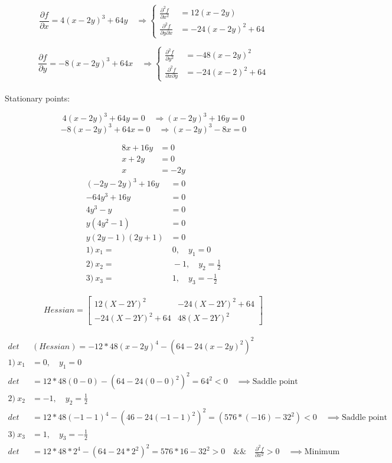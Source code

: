 \documentclass[12pt]{article}         %
\begin{document}
$$
\frac {\partial f}{\partial x} = 4(x-2y)^3 + 64y \quad\Rightarrow 
	\left\{
	\begin{aligned}
		\frac {\partial^2 f}{\partial x^2}&=12(x-2y)\\
		\frac {\partial^2 f}{\partial y \partial x}&=-24(x-2y)^2 +64
	 \end{aligned} 
	 \right.
$$

$$
\frac {\partial f}{\partial y} = -8(x-2y)^3 +64x \quad\Rightarrow 
	\left\{
	\begin{aligned}
		\frac {\partial^2 f}{\partial y^2}&=-48(x-2y)^2\\ 
		\frac {\partial^2 f}{\partial x \partial y}&=-24(x-2)^2 +64
	 \end{aligned} 
	 \right.
$$\\

Stationary points:

$$
4(x-2y)^3 +64y=0  \quad\Rightarrow 
(x-2y)^3 + 16y=0
$$
$$
-8(x-2y)^3+64x=0  \quad\Rightarrow
(x-2y)^3 -8x=0
$$

$$
\begin{aligned}
8x+16y&=0\\
x+2y&=0\\
x&=-2y
\end{aligned}
$$
$$
\begin{aligned}
(-2y -2y)^3 +16y&=0\\
-64y^3 +16y&=0\\
4y^3 -y&=0\\
y(4y^2 -1)&=0\\
y(2y-1)(2y+1)&=0\\
1)\: x_1=&\:0,\quad y_1=0\\
2)\: x_2=&\: -\!1,\quad y_2=\frac{1}{2}\\ 
3)\: x_3=&\:1,\quad y_3=-\frac{1}{2}
\end{aligned}
$$

\begin{gather}
Hessian = 
  \begin{bmatrix}
  12 (X - 2Y)^2 &
  -24 (X - 2Y)^2 + 64\\
  -24 (X - 2Y)^2  +64 &
  48 (X - 2Y)^2 
   \end{bmatrix}
    \nonumber
\end{gather}


$$
\begin{aligned}
det&(Hessian)=-12*48(x-2y)^4 -(64-24(x-2y)^2)^2\\
1)\: x_1&=0, \quad y_1=0\\
det&=12*48(0-0) - (64-24(0-0)^2)^2 =64^2 < 0   \quad\implies \text{Saddle point}\\
2)\: x_2&=-1, \quad y_2=\frac{1}{2}\\
det&=12*48(-1-1)^4 -(46-24(-1-1)^2)^2=(576*(-16)-32^2)<0 \quad\implies \text{Saddle point}\\
3)\: x_3&=1, \quad y_3=-\frac{1}{2}\\
det&=12*48*2^4 -(64 -24*2^2)^2 = 576*16-32^2>0 \quad \&\& \quad \frac {\partial^2 f}{\partial x^2} > 0 \quad\implies \text{Minimum}\\
\end{aligned}
$$
 \pagebreak
\end{document}
